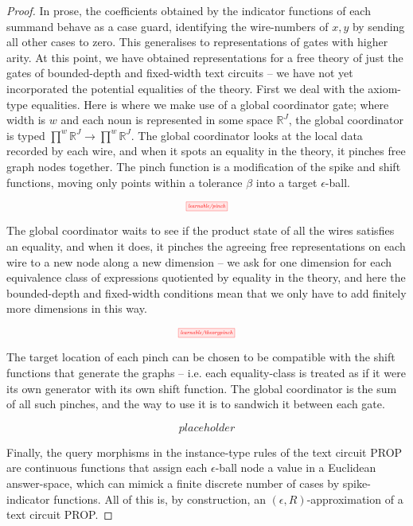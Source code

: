 \begin{fullwidth}
\begin{theorem}
\begin{proof}
In prose, the coefficients obtained by the indicator functions of each summand behave as a case guard, identifying the wire-numbers of $x,y$ by sending all other cases to zero. This generalises to representations of gates with higher arity. At this point, we have obtained representations for a free theory of just the gates of bounded-depth and fixed-width text circuits -- we have not yet incorporated the potential equalities of the theory. First we deal with the axiom-type equalities. Here is where we make use of a global coordinator gate; where width is $w$ and each noun is represented in some space $\mathbb{R}^J$, the global coordinator is typed $\prod\limits^w \mathbb{R}^J \rightarrow \prod\limits^w \mathbb{R}^J$. The global coordinator looks at the local data recorded by each wire, and when it spots an equality in the theory, it pinches free graph nodes together. The pinch function is a modification of the spike and shift functions, moving only points within a tolerance $\beta$ into a target $\epsilon$-ball.

\[\scalebox{0.5}{\tikzfig{learnable/pinch}}\]

The global coordinator waits to see if the product state of all the wires satisfies an equality, and when it does, it pinches the agreeing free representations on each wire to a new node along a new dimension -- we ask for one dimension for each equivalence class of expressions quotiented by equality in the theory, and here the bounded-depth and fixed-width conditions mean that we only have to add finitely more dimensions in this way.

\[\scalebox{0.5}{\tikzfig{learnable/theorypinch}}\]

The target location of each pinch can be chosen to be compatible with the shift functions that generate the graphs -- i.e. each equality-class is treated as if it were its own generator with its own shift function. The global coordinator is the sum of all such pinches, and the way to use it is to sandwich it between each gate.

\[placeholder\]

Finally, the query morphisms in the instance-type rules of the text circuit PROP are continuous functions that assign each $\epsilon$-ball node a value in a Euclidean answer-space, which can mimick a finite discrete number of cases by spike-indicator functions. All of this is, by construction, an $(\epsilon,R)$-approximation of a text circuit PROP.
\end{proof}
\end{theorem}


\end{fullwidth}
